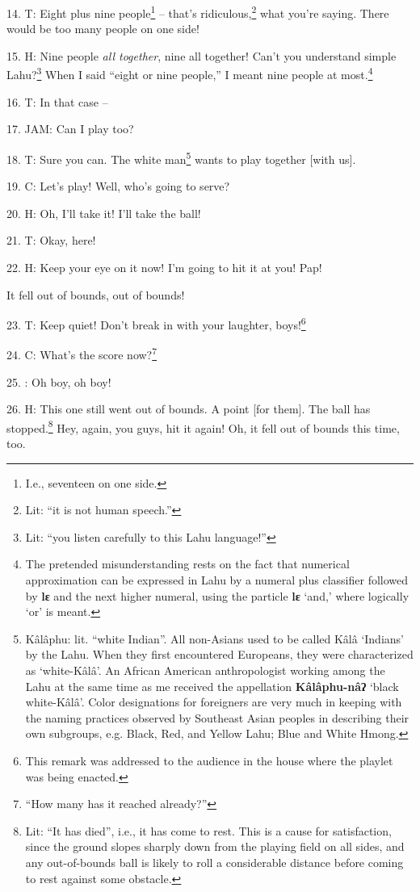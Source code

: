 14. T:  Eight plus nine people\footnote{I.e., seventeen on one side.}
-- that's ridiculous,\footnote{Lit: ``it is not human speech.''} what you're saying. There would be too many people on
one side!

15. H: Nine people \textit{all together}, nine all together! Can't you understand
simple Lahu?\footnote{Lit: ``you listen carefully to this Lahu language!''} When I said ``eight or nine people,'' I meant
nine people at most.\footnote{The pretended misunderstanding rests on the fact that numerical approximation can be expressed in Lahu by a numeral plus classifier followed by \textbf{lɛ} and the next higher numeral, using the particle \textbf{lɛ} `and,' where logically `or' is meant.}

16. T: In that case --

17. JAM: Can I play too?

18. T: Sure you can. The white man\footnote{Kâlâphu: lit. ``white Indian''. All non-Asians used to be called Kâlâ `Indians' by the Lahu. When they first encountered Europeans, they were characterized as `white-Kâlâ'. An African American anthropologist working among the Lahu at the same time as me received the appellation \textbf{Kâlâphu-nâʔ} `black white-Kâlâ'. Color designations for foreigners are very much in keeping with the naming practices observed by Southeast Asian peoples in describing their own subgroups, e.g. Black, Red, and Yellow Lahu; Blue and White Hmong.} wants to play together [with us].

19. C: Let's play! Well, who's going to serve?

20. H: Oh, I'll take it! I'll take the ball!

21. T: Okay, here!

22. H: Keep your eye on it now! I'm going to hit it at you! Pap!


It fell out of bounds, out of bounds!

23. T: Keep quiet! Don't break in with your laughter, boys!\footnote{This remark was addressed to the audience in the house where the playlet was being enacted.}

24. C: What's the score now?\footnote{``How many has it reached already?''}

25. : Oh boy, oh boy!

26. H: This one still went out of bounds. A point [for them]. The ball has stopped.\footnote{Lit: ``It has died'', i.e., it has come to rest. This is a cause for satisfaction, since the ground slopes sharply down from the playing field on all sides, and any out-of-bounds ball is likely to roll a considerable distance before coming to rest against some obstacle.}
Hey, again, you guys, hit it again! Oh, it fell out of bounds this time, too.

